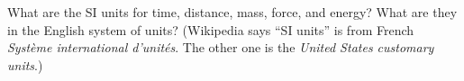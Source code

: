 What are the SI units for time, distance, mass, force, and energy?  What are they in the English system of units?  (Wikipedia says ``SI units'' is from French \emph{Système international d'unités}.  The other one is the \emph{United States customary units}.)
